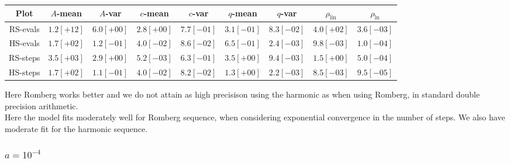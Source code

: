 \begin{table}[H]
    \centering
    \small
    \begin{tabular}{c||c|c|c|c|c|c|c|c}
Plot & \(A\)-mean & \(A\)-var & \(c\)-mean & \(c\)-var & \(q\)-mean & \(q\)-var & \(\rho_{\operatorname{lin}}\) & \(\rho_{\ln}\)\\\hline
\rowcolor{red}
RS-evals & \(1.2[+12]\) & \(6.0[+00]\) & \(2.8[+00]\) & \(7.7[-01]\) & \(3.1[-01]\) & \(8.3[-02]\) & \(4.0[+02]\) & \(3.6[-03]\) \\
\rowcolor{green}
HS-evals & \(1.7[+02]\) & \(1.2[-01]\) & \(4.0[-02]\) & \(8.6[-02]\) & \(6.5[-01]\) & \(2.4[-03]\) & \(9.8[-03]\) & \(1.0[-04]\) \\
\rowcolor{green}
RS-steps & \(3.5[+03]\) & \(2.9[+00]\) & \(5.2[-03]\) & \(6.3[-01]\) & \(3.5[+00]\) & \(9.4[-03]\) & \(1.5[+00]\) & \(5.0[-04]\) \\
\rowcolor{green}
HS-steps & \(1.7[+02]\) & \(1.1[-01]\) & \(4.0[-02]\) & \(8.2[-02]\) & \(1.3[+00]\) & \(2.2[-03]\) & \(8.5[-03]\) & \(9.5[-05]\) \\
    \end{tabular}
    \label{tab:my_label}
\end{table}

Here Romberg works better and we do not attain as high precisison using the harmonic as when using Romberg, in standard double precision arithmetic.\\

Here the model fits moderately well for Romberg sequence, when considering exponential convergence in the number of steps. We also have moderate fit for the harmonic sequence.

\subsubsection{\(a = 10^{-4}\)}

